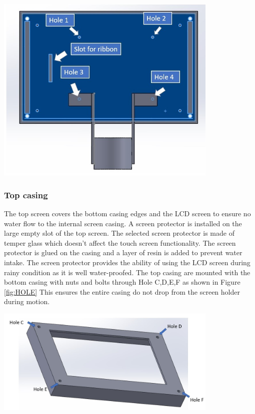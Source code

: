 \documentclass[11pt,landscape]{article}
\newenvironment{Figure}
  {\par\medskip\noindent\minipage{\linewidth}}
  {\endminipage\par\medskip}
\begin{document}
\begin{multicols}{3}
    
    \begin{Figure}
        \begin{center}
            \includegraphics[width=0.8\textwidth]{Figure11.jpg}
            \label{fig:bottom}
        \end{center}
    \end{Figure}
    

    \subsubsection{Top casing}
    The top screen covers the bottom casing edges and the LCD screen to ensure
    no water flow to the internal screen casing. A screen protector is installed
    on the large empty slot of the top screen. The selected screen protector is
    made of temper glass which doesn’t affect the touch screen functionality.
    The screen protector is glued on the casing and a layer of resin is added to
    prevent water intake. The screen protector provides the ability of using the
    LCD screen during rainy condition as it is well water-proofed. The top
    casing are mounted with the bottom casing with nuts and bolts through Hole
    C,D,E,F as shown in Figure \ref{fig:HOLE} This ensures the entire casing do
    not drop from the screen holder during motion.
    
    \begin{Figure}
        \begin{center}
            \includegraphics[width=0.8\textwidth]{Figure13.jpg}
            \label{fig:HOLE}
        \end{center}
    \end{Figure}
\end{multicols}
\end{document}

